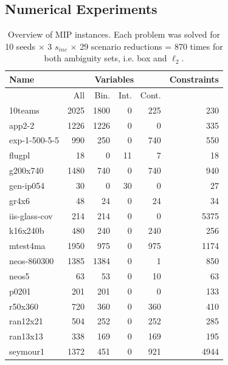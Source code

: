 \documentclass{article}
\begin{document}
\subsection*{Numerical Experiments}

\begin{table}[hbt]
	\centering
	\begin{tabular}{lrrrrr}
		\toprule
		Name &  \multicolumn{4}{c}{Variables} & Constraints \\
		\midrule
		& All & Bin. & Int. & Cont. & \\ \midrule
		10teams & 2025 & 1800 & 0 & 225 & 230 \\
		app2-2& 1226 & 1226 & 0 & 0 & 335 \\
		exp-1-500-5-5 & 990 & 250 & 0 & 740 & 550 \\
		flugpl& 18 & 0& 11& 7 & 18 \\
		g200x740 & 1480 & 740 & 0 & 740 & 940 \\
		gen-ip054 & 30 & 0 & 30 & 0 & 27 \\
		gr4x6 & 48 & 24 & 0 & 24 & 34 \\
		iis-glass-cov & 214 & 214 & 0 & 0 & 5375 \\
		k16x240b & 480 & 240 & 0 & 240 & 256 \\
		mtest4ma & 1950 & 975 & 0 & 975 & 1174 \\
		neos-860300 & 1385 & 1384 & 0 & 1 & 850 \\
		neos5 & 63 & 53 & 0 & 10 & 63 \\
		p0201 & 201 & 201 & 0 & 0 & 133 \\
		r50x360 & 720 & 360 & 0 & 360 & 410 \\
		ran12x21 & 504 & 252 & 0 & 252 & 285 \\
		ran13x13 & 338 & 169 & 0 & 169 & 195 \\
		seymour1 & 1372 & 451 & 0 & 921 & 4944 \\
		\bottomrule
	\end{tabular}
	\caption{\label{Table:overview_mip}Overview of MIP instances. Each problem was solved for 10 seeds \(\times\) 3 $s_{inc}$ \(\times\) 29 scenario reductions = 870 times for both ambiguity sets, i.e. box and $\ell_2$.}
\end{table}
\end{document}
